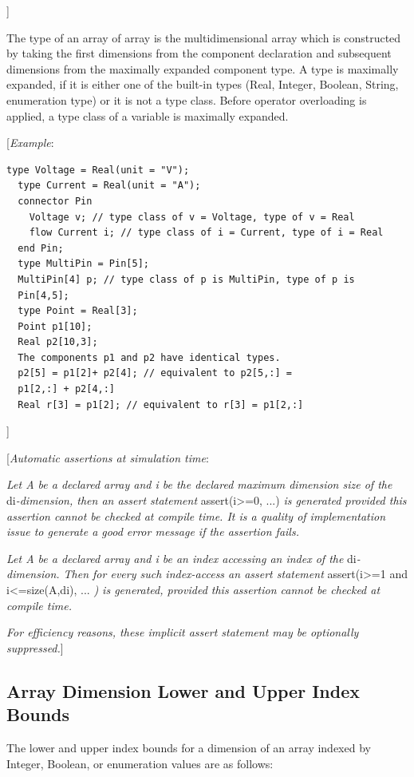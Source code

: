\documentclass[10pt,a4paper]{report}
\def\doublelabel#1{\label{#1}\hypertarget{#1}{}}
\begin{document}
{]}

The type of an array of array is the multidimensional array which is
constructed by taking the first dimensions from the component
declaration and subsequent dimensions from the maximally expanded
component type. A type is maximally expanded, if it is either one of the
built-in types (Real, Integer, Boolean, String, enumeration type) or it
is not a type class. Before operator overloading is applied, a type
class of a variable is maximally expanded.

{[}\emph{Example}:

\begin{lstlisting}[language=modelica]
  type Voltage = Real(unit = "V");
  type Current = Real(unit = "A");
  connector Pin
    Voltage v; // type class of v = Voltage, type of v = Real
    flow Current i; // type class of i = Current, type of i = Real
  end Pin;
  type MultiPin = Pin[5];
  MultiPin[4] p; // type class of p is MultiPin, type of p is
  Pin[4,5];
  type Point = Real[3];
  Point p1[10];
  Real p2[10,3];
  The components p1 and p2 have identical types.
  p2[5] = p1[2]+ p2[4]; // equivalent to p2[5,:] =
  p1[2,:] + p2[4,:]
  Real r[3] = p1[2]; // equivalent to r[3] = p1[2,:]
\end{lstlisting}
{]}

{[}\emph{Automatic assertions at simulation time}:

\emph{Let A be a declared array and i be the declared maximum dimension
size of the} di\emph{-dimension, then an assert statement}
assert(i\textgreater{}=0, ...) \emph{is generated provided this
assertion cannot be checked at compile time. It is a quality of
implementation issue to generate a good error message if the assertion
fails.}

\emph{Let A be a declared array and i be an index accessing an index of
the} di\emph{-dimension. Then for every such index-access an assert
statement} assert(i\textgreater{}=1 and i\textless{}=size(A,di), ...
\emph{) is generated, provided this assertion cannot be checked at
compile time.}

\emph{For efficiency reasons, these implicit assert statement may be
optionally suppressed.}{]}

\subsection{Array Dimension Lower and Upper Index Bounds}\doublelabel{array-dimension-lower-and-upper-index-bounds}

The lower and upper index bounds for a dimension of an array indexed by
Integer, Boolean, or enumeration values are as follows:
\end{document}
